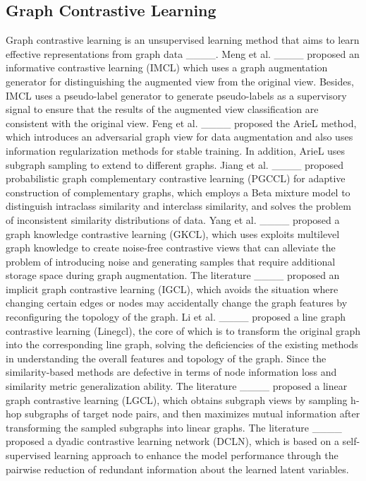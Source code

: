 \subsection{Graph Contrastive Learning}\label{2.2}
Graph contrastive learning is an unsupervised learning method that aims to learn effective representations from graph data ____.
Meng et al. ____ proposed an informative contrastive learning (IMCL) which uses a graph augmentation generator for distinguishing the augmented view from the original view. Besides, IMCL uses a pseudo-label generator to generate pseudo-labels as a supervisory signal to ensure that the results of the augmented view classification are consistent with the original view.  Feng et al. ____ proposed the ArieL method, which introduces an adversarial graph view for data augmentation and also uses information regularization methods for stable training. In addition, ArieL uses subgraph sampling to extend to different graphs. Jiang et al. ____ proposed probabilistic graph complementary contrastive learning (PGCCL) for adaptive construction of complementary graphs, which employs a Beta mixture model to distinguish intraclass similarity and interclass similarity, and solves the problem of inconsistent similarity distributions of data. Yang et al. ____ proposed a graph knowledge contrastive learning (GKCL), which uses exploits multilevel graph knowledge to create noise-free contrastive views that can alleviate the problem of introducing noise and generating samples that require additional storage space during graph augmentation. The literature ____ proposed an implicit graph contrastive learning (IGCL), which avoids the situation where changing certain edges or nodes may accidentally change the graph features by reconfiguring the topology of the graph. Li et al. ____ proposed a line graph contrastive learning (Linegcl), the core of which is to transform the original graph into the corresponding line graph, solving the deficiencies of the existing methods in understanding the overall features and topology of the graph. Since the similarity-based methods are defective in terms of node information loss and similarity metric generalization ability.
The literature ____ proposed a linear graph contrastive learning (LGCL), which obtains subgraph views by sampling h-hop subgraphs of target node pairs, and then maximizes mutual information after transforming the sampled subgraphs into linear graphs. The literature ____ proposed a dyadic contrastive learning network (DCLN), which is based on a self-supervised learning approach to enhance the model performance through the pairwise reduction of redundant information about the learned latent variables.

